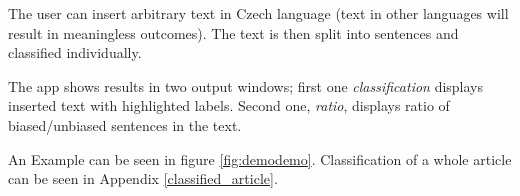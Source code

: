 The user can insert arbitrary text in Czech language (text in other languages will result in meaningless outcomes). The text is then split into sentences and classified individually.

The app shows results in two output windows; first one \textit{classification} displays inserted text with highlighted labels. Second one, \textit{ratio}, displays ratio of biased/unbiased sentences in the text.

An Example can be seen in figure \ref{fig:demodemo}. 
Classification of a whole article can be seen in Appendix \ref{classified_article}.

\begin{figure}
\end{figure}



